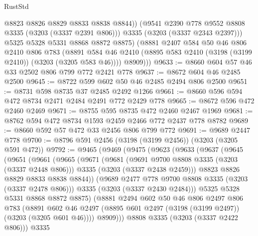 \begin{lexlean}{RustStd}
\begin{coremodule}
                @8823
                @8826
                @8829
                @8833
                @8838
                @8844))
            (@9541 @2390 @778 @9552 @8808 @3335 (@3203 (@3337 @2391 @806)))
            @3335
            (@3203 (@3337 @2343 @2397)))
          @5325
          @5328
          @5331
          @8868
          @8872
          @8875)
        (@8881
          @2407
          @584
          @50
          @46
          @806
          @2410
          @806
          @783
          (@8891 @584 @46 @2410 (@8895 @583 @2410 (@3198 (@3199 @2410)) (@3203 (@3205 @583 @46))))
          @8909)))
@9633 := @8660 @604 @57 @46 @33 @2502 @806 @799 @772 @2421 @778
@9637 := @8672 @604 @46 @2485 @2500
@9645 := @8722 @599 @602 @50 @46 @2485 @2494 @806 @2500
@9651 := @8731 @598 @8735 @37 @2485 @2492 @1266
@9661 := @8660 @596 @594 @472 @8734 @2471 @2484 @2491 @772 @2429 @778
@9665 := @8672 @596 @472 @2460 @2469
@9671 := @8755 @595 @8735 @472 @2460 @2467 @1969
@9681 := @8762 @594 @472 @8734 @1593 @2459 @2466 @772 @2437 @778 @8782
@9689 := @8660 @592 @57 @472 @33 @2456 @806 @799 @772
@9691 := @9689 @2447 @778
@9700 := @8796 @591 @2456 (@3198 (@3199 @2456)) (@3203 (@3205 @591 @472))
@9792 := @9465
    (@9469
      (@9475
        (@9623
          (@9633
            (@9637
              (@9645
                (@9651
                  (@9661
                    (@9665
                      (@9671
                        (@9681
                          (@9691 @9700 @8808 @3335 (@3203 (@3337 @2448 @806)))
                          @3335
                          (@3203 (@3337 @2438 @2459)))
                        @8823
                        @8826
                        @8829
                        @8833
                        @8838
                        @8844))
                    (@9689 @2477 @778 @9700 @8808 @3335 (@3203 (@3337 @2478 @806)))
                    @3335
                    (@3203 (@3337 @2430 @2484)))
                  @5325
                  @5328
                  @5331
                  @8868
                  @8872
                  @8875)
                (@8881
                  @2494
                  @602
                  @50
                  @46
                  @806
                  @2497
                  @806
                  @783
                  (@8891
                    @602
                    @46
                    @2497
                    (@8895 @601 @2497 (@3198 (@3199 @2497)) (@3203 (@3205 @601 @46))))
                  @8909)))
            @8808
            @3335
            (@3203 (@3337 @2422 @806)))
          @3335

\end{coremodule}
\end{lexlean}
